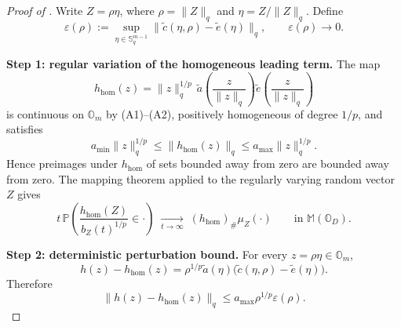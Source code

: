 \documentclass{article}
\theoremstyle{definition}
\begin{document}
\begin{proof}[Proof of ]
Write \(Z=\rho\eta\), where \(\rho=\|Z\|_q\) and
\(\eta=Z/\|Z\|_q\). Define
\[
\varepsilon(\rho)
:=
\sup_{\eta\in\mathbb{S}^{m-1}_q}
\|\tilde c(\eta,\rho)-\tilde e(\eta)\|_q,
\qquad
\varepsilon(\rho)\to0.
\]

\textbf{Step 1: regular variation of the homogeneous leading term.}
The map
\[
h_{\mathrm{hom}}(z)
=
\|z\|_q^{1/p}\,
\tilde a\!\left(\frac{z}{\|z\|_q}\right)
\tilde e\!\left(\frac{z}{\|z\|_q}\right)
\]
is continuous on \(\mathbb{O}_m\) by (A1)--(A2), positively homogeneous of
degree \(1/p\), and satisfies
\[
a_{\min}\|z\|_q^{1/p}
\le
\|h_{\mathrm{hom}}(z)\|_q
\le
a_{\max}\|z\|_q^{1/p}.
\]
Hence preimages under \(h_{\mathrm{hom}}\) of sets bounded away from zero are
bounded away from zero. The mapping theorem applied to the regularly varying
random vector \(Z\) gives
\[
t\,\mathbb{P}\!\left(
\frac{h_{\mathrm{hom}}(Z)}{b_Z(t)^{1/p}}\in\cdot
\right)
\;\xrightarrow[t\to\infty]{}\;
(h_{\mathrm{hom}})_{\#}\mu_Z(\cdot)
\qquad
\text{in }\mathbb{M}(\mathbb{O}_D).
\]

\textbf{Step 2: deterministic perturbation bound.}
For every \(z=\rho\eta\in\mathbb{O}_m\),
\[
h(z)-h_{\mathrm{hom}}(z)
=
\rho^{1/p}\tilde a(\eta)\bigl(\tilde c(\eta,\rho)-\tilde e(\eta)\bigr).
\]
Therefore
\[
\|h(z)-h_{\mathrm{hom}}(z)\|_q
\le
a_{\max}\rho^{1/p}\varepsilon(\rho).
\]


\end{proof}
\end{document}
